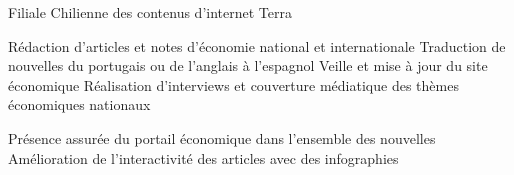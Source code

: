 \documentclass[30pt, french]{tccv}
\begin{document}
\begin{upshape}
\begin{experience}
 Filiale Chilienne des contenus d’internet Terra  \\
  
\setlength{\parskip}{-10pt}
\begin{itemize}
      \setlength\itemsep{-3pt} 
      \cvitem[\checkmark] Rédaction d'articles et notes d’économie national et internationale
      \cvitem[\checkmark] Traduction de nouvelles du portugais ou de l'anglais à l'espagnol
      \cvitem[\checkmark] Veille et mise à jour du site économique
      \cvitem[\checkmark] Réalisation d'interviews et couverture médiatique des thèmes économiques nationaux
\end{itemize}        

 Présence assurée du portail économique dans l’ensemble des nouvelles \\
\mission{}           Amélioration de l’interactivité des articles avec des infographies

   

\end{experience}






\end{upshape}
\end{document}
